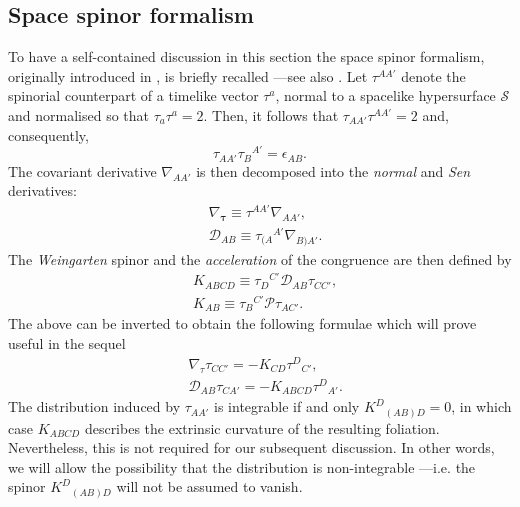 \documentclass[10pt,a4paper]{article}
\theoremstyle{plain}
\begin{document}
\subsection*{Space spinor formalism}

To have a self-contained discussion in this section the space spinor
formalism, originally introduced in \cite{Som80}, is briefly recalled
---see also \cite{GarVal08c,BaeVal10b,CFEbook}.  Let $\tau^{AA'}$
denote the spinorial counterpart of a timelike vector $\tau^{a}$,
normal to a spacelike hypersurface $\mathcal{S}$ and normalised so
that $\tau_{a}\tau^{a}=2$.  Then, it follows that
$\tau_{AA'}\tau^{AA'}=2$ and, consequently,
\[\tau_{AA'}\tau_B{}^{A'}=\epsilon_{AB}.\]  
The covariant derivative $\nabla_{AA'}$ is then decomposed into the
\emph{normal} and \emph{Sen} derivatives:
\begin{align*}
  &\nabla_{\bm\tau} \equiv \tau^{AA'}\nabla_{AA'},\\ & \mathcal{D}_{AB}\equiv
  \tau_{(A}{}^{A'}\nabla_{B)A'}.
\end{align*}
The \emph{Weingarten} spinor and the \emph{acceleration} of the
congruence are then defined by
\begin{align*}
& K_{ABCD} \equiv \tau_{D}{}^{C'} \mathcal{D}_{AB}\tau_{CC'},\\ &
  K_{AB} \equiv \tau_{B}{}^{C'} \mathcal{P}\tau_{AC'}.
\end{align*}
The above can be inverted to obtain the following formulae which will
prove useful in the sequel
\begin{align*}
  & \nabla_\tau \tau_{CC'}=- K_{CD} \tau^{D}{}_{C'},\\ &
  \mathcal{D}_{AB}\tau_{CA'} = - K_{ABCD} \tau^{D}{}_{A'}.
\end{align*}
The distribution induced by $\tau_{AA'}$ is integrable if and only
$K^D{}_{(AB)D}=0$, in which case $K_{ABCD}$ describes the extrinsic
curvature of the resulting foliation.
 Nevertheless, this is not required for our subsequent discussion.
In other words, we will allow
 the possibility that the distribution is non-integrable
---i.e. the spinor $ K^D{}_{(AB)D}$ will not be assumed
to vanish. 

\medskip
\end{document}
